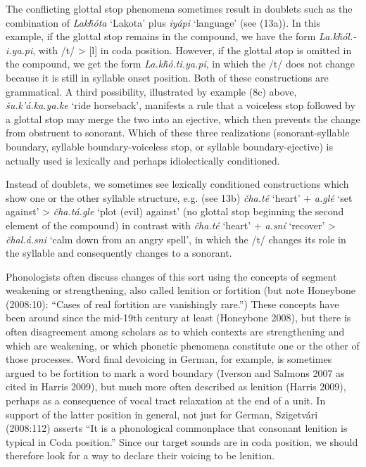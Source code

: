 \documentclass[output=paper]{LSP/langsci}
\begin{document}
The conflicting glottal stop phenomena sometimes result in doublets such as the combination of \textit{Lak\v{h}\'ota} `Lakota' plus \textit{iy\'api} `language' (see (13a)). In this example, if the glottal stop remains in the compound, we have the form \textit{La.k\v{h}\'ol.- i.ya.pi}, with /t/ > [l] in coda position. However, if the glottal stop is omitted in the compound, we get the form \textit{La.k\v{h}\'o.ti.ya.pi}, in which the /t/ does not change because it is still in syllable onset position. Both of these constructions are grammatical. A third possibility, illustrated by example (8c) above, \textit{\v{s}u.k'\'a.ka.ya.ke} `ride horseback', manifests a rule that a voiceless stop followed by a glottal stop may merge the two into an ejective, which then prevents the change from obstruent to sonorant. Which of these three realizations (sonorant-syllable boundary, syllable boundary-voiceless stop, or syllable boundary-ejective) is actually used is lexically and perhaps idiolectically conditioned.

Instead of doublets, we sometimes see lexically conditioned constructions which show one or the other syllable structure, e.g. (see 13b) \textit{\v{c}ha.t\'e} `heart' + \textit{a.gl\'e} `set against' > \textit{\v{c}ha.t\'a.gle} `plot (evil) against' (no glottal stop beginning the second element of the compound) in contrast with \textit{\v{c}ha.t\'e} `heart' + \textit{a.sn\'i} `recover' > \textit{\v{c}hal.\'a.sni} `calm down from an angry spell', in which the /t/ changes its role in the syllable and consequently changes to a sonorant.

Phonologists often discuss changes of this sort using the concepts of segment weakening or strengthening, also called lenition or fortition (but note Honeybone (2008:10): ``Cases of real fortition are vanishingly rare.'') These concepts have been around since the mid-19th century at least (Honeybone 2008), but there is often disagreement among scholars as to which contexts are strengthening and which are weakening, or which phonetic phenomena constitute one or the other of those processes. Word final devoicing in German, for example, is sometimes argued to be fortition to mark a word boundary (Iverson and Salmons 2007 as cited in Harris 2009), but much more often described as lenition (Harris 2009), perhaps as a consequence of vocal tract relaxation at the end of a unit. In support of the latter position in general, not just for German, Szigetv\'ari (2008:112) asserts ``It is a phonological commonplace that consonant lenition is typical in Coda position.'' Since our target sounds are in coda position, we should therefore look for a way to declare their voicing to be lenition.
\end{document}

